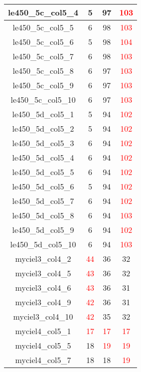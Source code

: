 \begin{longtable}{|c|c|c|c|}
  le450\_5c\_col5\_4 & 5 & 97 & \textcolor{red}{103} \\ \hline
  le450\_5c\_col5\_5 & 6 & 98 & \textcolor{red}{103} \\ \hline
  le450\_5c\_col5\_6 & 5 & 98 & \textcolor{red}{104} \\ \hline
  le450\_5c\_col5\_7 & 6 & 98 & \textcolor{red}{103} \\ \hline
  le450\_5c\_col5\_8 & 6 & 97 & \textcolor{red}{103} \\ \hline
  le450\_5c\_col5\_9 & 6 & 97 & \textcolor{red}{103} \\ \hline
  le450\_5c\_col5\_10 & 6 & 97 & \textcolor{red}{103} \\ \hline
  le450\_5d\_col5\_1 & 5 & 94 & \textcolor{red}{102} \\ \hline
  le450\_5d\_col5\_2 & 5 & 94 & \textcolor{red}{102} \\ \hline
  le450\_5d\_col5\_3 & 6 & 94 & \textcolor{red}{102} \\ \hline
  le450\_5d\_col5\_4 & 6 & 94 & \textcolor{red}{102} \\ \hline
  le450\_5d\_col5\_5 & 6 & 94 & \textcolor{red}{102} \\ \hline
  le450\_5d\_col5\_6 & 5 & 94 & \textcolor{red}{102} \\ \hline
  le450\_5d\_col5\_7 & 6 & 94 & \textcolor{red}{102} \\ \hline
  le450\_5d\_col5\_8 & 6 & 94 & \textcolor{red}{103} \\ \hline
  le450\_5d\_col5\_9 & 6 & 94 & \textcolor{red}{102} \\ \hline
  le450\_5d\_col5\_10 & 6 & 94 & \textcolor{red}{103} \\ \hline
  myciel3\_col4\_2 & \textcolor{red}{44} & 36 & 32 \\ \hline
  myciel3\_col4\_5 & \textcolor{red}{43} & 36 & 32 \\ \hline
  myciel3\_col4\_6 & \textcolor{red}{43} & 36 & 31 \\ \hline
  myciel3\_col4\_9 & \textcolor{red}{42} & 36 & 31 \\ \hline
  myciel3\_col4\_10 & \textcolor{red}{42} & 35 & 32 \\ \hline
  myciel4\_col5\_1 & \textcolor{red}{17} & \textcolor{red}{17} & \textcolor{red}{17} \\ \hline
  myciel4\_col5\_5 & 18 & \textcolor{red}{19} & \textcolor{red}{19} \\ \hline
  myciel4\_col5\_7 & 18 & 18 & \textcolor{red}{19} \\ \hline

\end{longtable}
